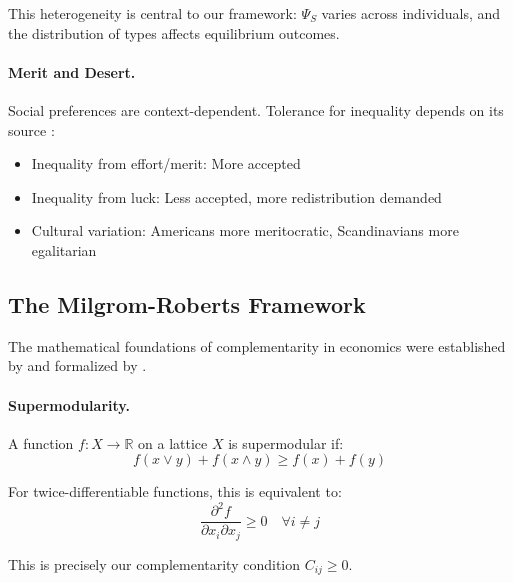 This heterogeneity is central to our framework: $\Psi_S$ varies across individuals,
and the distribution of types affects equilibrium outcomes.

\paragraph{Merit and Desert.}
Social preferences are context-dependent. Tolerance for inequality depends on
its source \citep{cappelen2007,almas2020}:
\begin{itemize}
  \item Inequality from effort/merit: More accepted
  \item Inequality from luck: Less accepted, more redistribution demanded
  \item Cultural variation: Americans more meritocratic, Scandinavians more egalitarian
\end{itemize}


\subsection{The Milgrom-Roberts Framework}

The mathematical foundations of complementarity in economics were established by
\citet{milgromroberts1990compare,milgromroberts1990modern} and formalized by
\citet{topkis1998}.

\paragraph{Supermodularity.}
A function $f: X \to \mathbb{R}$ on a lattice $X$ is supermodular if:
\begin{equation}
  f(x \vee y) + f(x \wedge y) \geq f(x) + f(y)
  \label{eq:supermodular}
\end{equation}

For twice-differentiable functions, this is equivalent to:
\begin{equation}
  \frac{\partial^2 f}{\partial x_i \partial x_j} \geq 0 \quad \forall i \neq j
\end{equation}

This is precisely our complementarity condition $C_{ij} \geq 0$.

